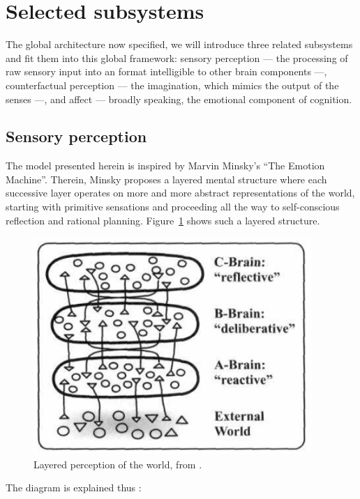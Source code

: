 \documentclass[]{scrartcl}
\theoremstyle{break}
\begin{document}
\section{Selected subsystems}\label{sec:selectedSubsystems}

The global architecture now specified, we will introduce three related subsystems and fit them into this global framework: sensory perception --- the processing of raw sensory input into an format intelligible to other brain components ---, counterfactual perception --- the imagination, which mimics the output of the senses ---, and affect --- broadly speaking, the emotional component of cognition.

\subsection{Sensory perception}\label{sec:sensoryPerception}

The model presented herein is inspired by Marvin Minsky's ``The Emotion Machine''. Therein, Minsky proposes a layered mental structure where each successive layer operates on more and more abstract representations of the world, starting with primitive sensations and proceeding all the way to self-conscious reflection and rational planning. Figure~\ref{fig:brainLayers} shows such a layered structure.

 \begin{figure}[!h]
 	\centering
 	\includegraphics[width=300pt]{figs/emotionMachine_brainLayers.png}
 	\caption{Layered perception of the world, from \cite[p. 100]{emotionMachine}.}
 	\label{fig:brainLayers}
 \end{figure}
 
 \newpage
 
The diagram is explained thus \cite[p. 100]{emotionMachine}:
\end{document}
